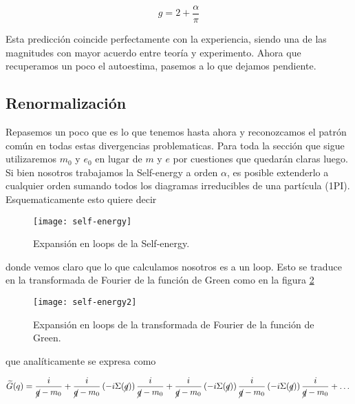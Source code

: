 \documentclass[tickz]{article}
\numberwithin{equation}{section}
\begin{document}
\begin{boxquation}
\begin{equation}\label{g}
g = 2 + \frac{\alpha}{\pi}
\end{equation}
\end{boxquation}

Esta predicción coincide perfectamente con la experiencia, siendo una de las magnitudes con mayor acuerdo entre teoría y experimento. Ahora que recuperamos un poco el autoestima, pasemos a lo que dejamos pendiente.


\subsection{Renormalización}

Repasemos un poco que es lo que tenemos hasta ahora y reconozcamos el patrón común en todas estas divergencias problematicas. Para toda la sección que sigue utilizaremos $ m_0 $ y $ e_0 $ en lugar de $ m $ y $ e $ por cuestiones que quedarán claras luego. Si bien nosotros trabajamos la Self-energy a orden $ \alpha $, es posible extenderlo a cualquier orden sumando todos los diagramas irreducibles de una partícula (1PI). Esquematicamente esto quiere decir

\begin{figure}[h]
	\centering
	\texttt{[image: self-energy]}
	\caption{Expansión en loops de la Self-energy.}
	\label{fig_selfenergy}
\end{figure}

donde vemos claro que lo que calculamos nosotros es a un loop. Esto se traduce en la transformada de Fourier de la función de Green como en la figura \ref{fig_selfenergy2}

\newpage

\begin{figure}[h]
	\centering
	\texttt{[image: self-energy2]}
	\caption{Expansión en loops de la transformada de Fourier de la función de Green.}
	\label{fig_selfenergy2}
\end{figure}

que analíticamente se expresa como 

\begin{equation}\label{key}
 \widetilde{G}(q) = \frac{i}{\cancel{q}- m_0} + \frac{i}{\cancel{q}- m_0} \left(-i \Sigma(\cancel{q})\right) \frac{i}{\cancel{q}- m_0} + \frac{i}{\cancel{q}- m_0} \left(-i \Sigma(\cancel{q})\right) \frac{i}{\cancel{q}- m_0}\left(-i \Sigma(\cancel{q})\right) \frac{i}{\cancel{q}- m_0} + \dots
\end{equation}
\end{document}
